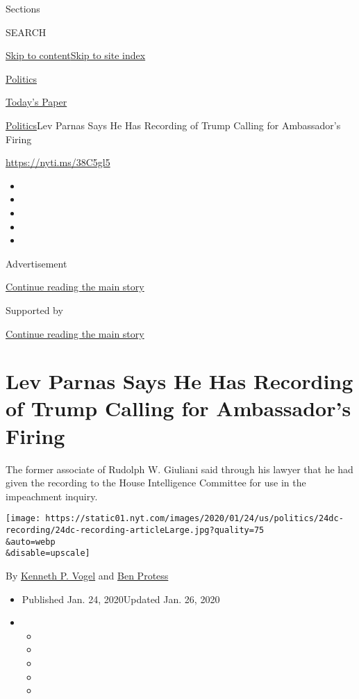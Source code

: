 Sections

SEARCH

\protect\hyperlink{site-content}{Skip to
content}\protect\hyperlink{site-index}{Skip to site index}

\href{https://www.nytimes.com/section/politics}{Politics}

\href{https://myaccount.nytimes.com/auth/login?response_type=cookie\&client_id=vi}{}

\href{https://www.nytimes.com/section/todayspaper}{Today's Paper}

\href{/section/politics}{Politics}\textbar{}Lev Parnas Says He Has
Recording of Trump Calling for Ambassador's Firing

\url{https://nyti.ms/38C5gl5}

\begin{itemize}
\item
\item
\item
\item
\item
\end{itemize}

Advertisement

\protect\hyperlink{after-top}{Continue reading the main story}

Supported by

\protect\hyperlink{after-sponsor}{Continue reading the main story}

\hypertarget{lev-parnas-says-he-has-recording-of-trump-calling-for-ambassadors-firing}{%
\section{Lev Parnas Says He Has Recording of Trump Calling for
Ambassador's
Firing}\label{lev-parnas-says-he-has-recording-of-trump-calling-for-ambassadors-firing}}

The former associate of Rudolph W. Giuliani said through his lawyer that
he had given the recording to the House Intelligence Committee for use
in the impeachment inquiry.

\texttt{[image: https://static01.nyt.com/images/2020/01/24/us/politics/24dc-recording/24dc-recording-articleLarge.jpg?quality=75\\\&auto=webp\\\&disable=upscale]}

By \href{https://www.nytimes.com/by/kenneth-p-vogel}{Kenneth P. Vogel}
and \href{https://www.nytimes.com/by/ben-protess}{Ben Protess}

\begin{itemize}
\item
  Published Jan. 24, 2020Updated Jan. 26, 2020
\item
  \begin{itemize}
  \item
  \item
  \item
  \item
  \item
  \end{itemize}
\end{itemize}

